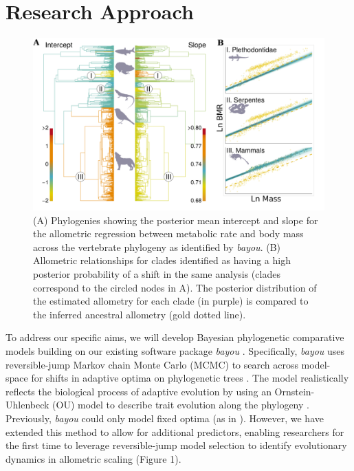 \documentclass[10pt, a4paper]{article}
\begin{document}
\section*{Research Approach}
\begin{figure}
\includegraphics[width=0.95\linewidth]{Figure1} 
\caption{(A) Phylogenies showing the posterior mean intercept and slope for the allometric regression between metabolic rate and body mass across the vertebrate phylogeny as identified by \textit{bayou}. (B) Allometric relationships for clades identified as having a high posterior probability of a shift in the same analysis (clades correspond to the circled nodes in A). The posterior distribution of the estimated allometry for each clade (in purple) is compared to the inferred ancestral allometry (gold dotted line). }
\label{fig:test}
\end{figure}	

To address our specific aims, we will develop Bayesian phylogenetic comparative models building on our existing software package \textit{bayou} \cite{UyedaHarmon2014}. Specifically, \textit{bayou} uses reversible-jump Markov chain Monte Carlo (MCMC) to search across model-space for shifts in adaptive optima on phylogenetic trees \cite{Green1995, HoAne2014}. The model realistically reflects the biological process of adaptive evolution by using an Ornstein-Uhlenbeck (OU) model to describe trait evolution along the phylogeny \cite{Hansen1997}. Previously, \textit{bayou} could only model fixed optima (as in \cite{ButlerKing2004}). However, we have extended this method to allow for additional predictors, enabling researchers for the first time to leverage reversible-jump model selection to identify  evolutionary dynamics in allometric scaling (Figure 1). \
\end{document}
